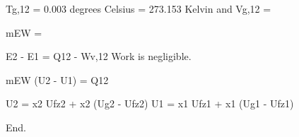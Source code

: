 Tg,12 = 0.003 degrees Celsius = 273.153 Kelvin and Vg,12 =  

mEW =  

E2 - E1 = Q12 - Wv,12  
Work is negligible.  

mEW (U2 - U1) = Q12  

U2 = x2 Ufz2 + x2 (Ug2 - Ufz2)  
U1 = x1 Ufz1 + x1 (Ug1 - Ufz1)  

End.